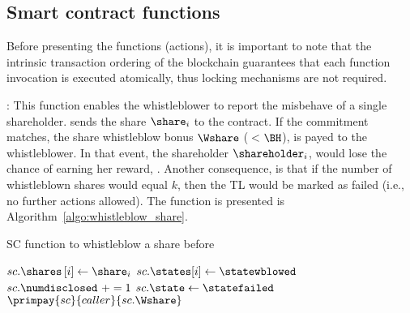 \subsection{Smart contract functions}\label{sect:sc_functions}

Before presenting the functions (actions), it is important to note that the intrinsic transaction ordering of the blockchain guarantees that each function invocation is executed atomically, thus locking mechanisms are not required.


\smallskip
\texttt{\algowhistleblowshare}:
This function enables the whistleblower to report the misbehave of a single shareholder.
\whistleblower sends the share $\share_{i}$ to the contract.
If the commitment matches, the share whistleblow bonus $\Wshare$ ($<$$\BH$), is payed to the whistleblower.
In that event, the shareholder $\shareholder_{i}$, would lose the chance of earning her reward, \RH.
Another consequence, is that if the number of whistleblown shares would equal $k$, then the TL would be marked as failed (i.e., no further actions allowed).
The function is presented is Algorithm~\ref{algo:whistleblow_share}.

\begin{algorithm}[t]
	\caption{SC function to whistleblow a share before \td}\label{algo:whistleblow_share}
	\begin{algorithmic}[1]
		\vspace{0.6em}
		\State $sc.\shares \left[ i \right] \gets \share_{i}$
		\State $sc.\states[i]\gets \statewblowed$
		\State $sc.\numdisclosed\ += 1$
		\State $sc.\state\gets \statefailed$
		\EndIf
		\State $\primpay{sc}{caller}{sc.\Wshare}$
		\EndIf
		\EndIf
		\EndIf
		\EndProcedure
	\end{algorithmic}
\end{algorithm}



